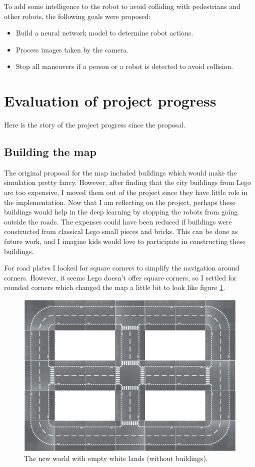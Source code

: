 \documentclass[12pt,a4paper]{article}
\begin{document}
To add some intelligence to the robot to avoid colliding with pedestrians and other robots,  the following goals were proposed:

\begin{itemize}
\item Build a neural network model to determine robot actions.
\item Process images taken by the camera. 
\item Stop all maneuvers if a person or a robot is detected to avoid collision. 
\end{itemize}

\section{Evaluation of project progress}
Here is the story of the project progress since the proposal. 
\subsection{Building the map}
The original proposal for the map included buildings which would make the simulation pretty fancy. However, after finding that the city buildings from Lego are too expensive, I moved them out of the project since they have little role in the implementation. Now that I am reflecting on the project, perhaps these buildings would help in the deep learning by stopping the robots from going outside the roads. The expenses could have been reduced if buildings were constructed from classical Lego small pieces and bricks. This can be done as future work, and I imagine kids would love to participate in constructing these buildings. 

For road plates I looked for square corners to simplify the navigation around corners. However, it seems Lego doesn't offer square corners, so  I settled for rounded corners which changed the map a little bit to look like figure \ref{fig:proposedMap}.

\begin{figure}[H]
\center
\includegraphics[scale=0.5]{./map.png}
\caption{The new world with empty white lands (without buildings).} \label{fig:proposedMap} 
\end{figure}
\end{document}
